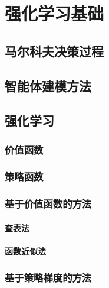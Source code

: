 \documentclass{standalone}
\begin{document}
\chapter{强化学习基础}
\section{马尔科夫决策过程}
\section{智能体建模方法}

\section{强化学习}

\subsection{价值函数}
\subsection{策略函数}
\subsection{基于价值函数的方法}
\subsubsection{查表法}
\subsubsection{函数近似法}

\subsection{基于策略梯度的方法}
\end{document}
